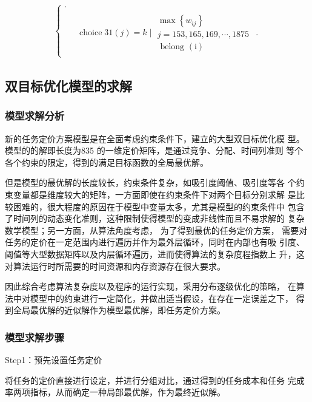 $$\begin{aligned}
\begin{cases}
            .                                                                \\
             & \begin{array}{l}
                \operatorname{choice} 31(j)=k\mid \begin{array}{l}
                    \max \left\{w_{i j}\right\} \\
                    j=153,165,169, \cdots, 1875 \\
                    \text { belong }(\mathrm{i})
                \end{array}
            \end{array}.
        \end{cases}
    \end{aligned}
$$
\subsection{双目标优化模型的求解}
\subsubsection{模型求解分析}
新的任务定价方案模型是在全面考虑约束条件下，建立的大型双目标优化模
型。模型的的解即长度为835 的一维定价矩阵，是通过竞争、分配、时间列准则
等个各个约束的限定，得到的满足目标函数的全局最优解。

但是模型的最优解的长度较长，约束条件复杂，如吸引度阈值、吸引度等各
个约束变量都是维度较大的矩阵，一方面即使在约束条件下对两个目标分别求解
是比较困难的，很大程度的原因在于模型中变量太多，尤其是模型的约束条件中
包含了时间列的动态变化准则，这种限制使得模型的变成非线性而且不易求解的
复杂数学模型；另一方面，从算法角度考虑， 为了得到最优的任务定价方案，
需要对任务的定价在一定范围内进行遍历并作为最外层循环，同时在内部也有吸
引度、阈值等大型数据矩阵以及内层循环遍历，进而使得算法的复杂度程指数上
升，这对算法运行时所需要的时间资源和内存资源存在很大要求。

因此综合考虑算法复杂度以及程序的运行实现，采用分布逐级优化的策略，
在算法中对模型中的约束进行一定简化，并做出适当假设，在存在一定误差之下，
得到全局最优解的近似解作为模型最优解，即任务定价方案。
\subsubsection{模型求解步骤}
Step1：预先设置任务定价

将任务的定价直接进行设定，并进行分组对比，通过得到的任务成本和任务
完成率两项指标，从而确定一种局部最优解，作为最终近似解。

